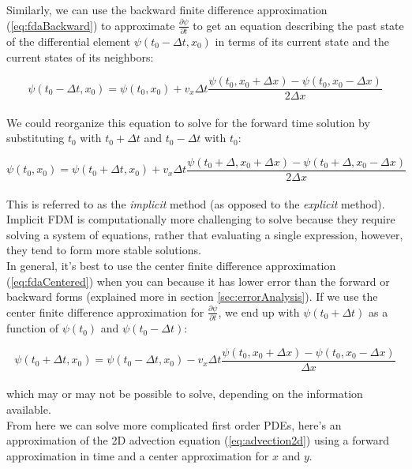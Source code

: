 {Similarly, we can use the backward finite difference approximation (\ref{eq:fdaBackward}) to approximate $\frac{\partial \psi}{\partial t}$ to get an equation describing the past state of the differential element $\psi(t_{0}-\Delta t, x_{0})$ in terms of its current state and the current states of its neighbors:

  \begin{equation}
  \psi(t_{0} - \Delta  t,  x_{0}) = \psi(t_{0}, x_{0}) + v_{x}\Delta t \frac{\psi(t_{0}, x_{0} + \Delta  x)-\psi(t_{0}, x_{0}-\Delta x)}{2\Delta  x}
  \end{equation}
  \\
  We could reorganize this equation to solve for the forward time solution by substituting $t_{0}$ with $t_{0}+\Delta t$ and $t_{0}-\Delta t$ with $t_{0}$:
  
  \begin{equation}
  \psi(t_{0},  x_{0}) = \psi(t_{0}+\Delta t, x_{0}) + v_{x}\Delta t \frac{\psi(t_{0}+\Delta, x_{0} + \Delta  x)-\psi(t_{0}+\Delta, x_{0}-\Delta x)}{2\Delta  x}
  \end{equation}
  \\
  This is referred to as the \textit{implicit} method (as opposed to the \textit{explicit} method).  Implicit FDM is computationally more challenging to solve because they require solving a system of equations, rather that evaluating a single expression, however, they tend to form more stable solutions.\\
  
  In general, it's best to use the center finite difference approximation (\ref{eq:fdaCentered}) when you can because it has lower error than the forward or backward forms (explained more in section \ref{sec:errorAnalysis}).  If we use the center finite difference approximation for $\frac{\partial \psi}{\partial t}$, we end up with $\psi(t_{0}+\Delta t)$ as a function of $\psi(t_{0})$ and $\psi(t_{0}-\Delta t)$:
  
     \begin{equation}
  \psi(t_{0} + \Delta  t,  x_{0}) = \psi(t_{0}-\Delta t, x_{0}) -v_{x}\Delta t \frac{\psi(t_{0}, x_{0} + \Delta  x)-\psi(t_{0}, x_{0}-\Delta x)}{\Delta  x}
  \end{equation}
  \\
  which may or may not be possible to solve, depending on the information available.\\
  
  From here we can solve more complicated first order PDEs, here's an approximation of the 2D advection equation (\ref{eq:advection2d}) using a forward approximation in time and a center approximation for $x$ and $y$.
  
}

